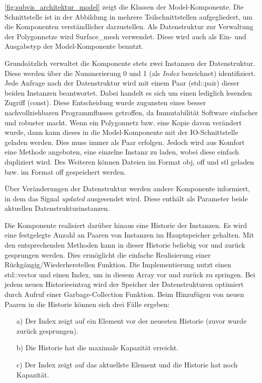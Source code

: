 \autoref{fig:subvis_architektur_model} zeigt die Klassen der Model-Komponente.
Die Schnittstelle ist in der Abbildung in mehrere Teilschnittstellen aufgegliedert, um die Komponenten verständlicher darzustellen.
Als Datenstruktur zur Verwaltung der Polygonnetze wird Surface\_mesh verwendet.
Diese wird auch als Ein- und Ausgabetyp der Model-Komponente benutzt.

Grundsätzlich verwaltet die Komponente stets zwei Instanzen der Datenstruktur.
Diese werden über die Nummerierung 0 und 1 (als \emph{Index} bezeichnet) identifiziert.
Jede Anfrage nach der Datenstruktur wird mit einem Paar (std::pair) dieser beiden Instanzen beantwortet. 
Dabei handelt es sich um einen lediglich lesenden Zugriff (const).
Diese Entscheidung wurde zugunsten eines besser nachvollziehbaren Programmflusses getroffen, da Immutabilität Software einfacher und robuster macht.
Wenn ein Polygonnetz bzw. eine Kopie davon verändert wurde, dann kann dieses in die Model-Komponente mit der IO-Schnittstelle geladen werden.
Dies muss immer als Paar erfolgen. 
Jedoch wird aus Komfort eine Methode angeboten, eine einzelne Instanz zu laden, wobei diese einfach dupliziert wird.
Des Weiteren können Dateien im Format obj, off und stl geladen bzw. im Format off gespeichert werden.

Über Veränderungen der Datenstruktur werden andere Komponente informiert, in dem das Signal \emph{updated} ausgesendet wird. 
Diese enthält als Parameter beide aktuellen Datenstrukturinstanzen.

Die Komponente realisiert darüber hinaus eine Historie der Instanzen.
Es wird eine festgelegte Anzahl an Paaren von Instanzen im Hauptspeicher gehalten.
Mit den entsprechenden Methoden kann in dieser Historie beliebig vor und zurück gesprungen werden.
Dies ermöglicht die einfache Realisierung einer Rückgängig/Wiederherstellen Funktion.
Die Implementierung nutzt einen std::vector und einen Index, um in diesem Array vor und zurück zu springen.
Bei jedem neuen Historieeintrag wird der Speicher der Datenstrukturen optimiert durch Aufruf einer Garbage-Collection Funktion.
Beim Hinzufügen von neuen Paaren in die Historie können sich drei Fälle ergeben:

\begin{itemize}
\item[a)] Der Index zeigt auf ein Element vor der neuesten Historie (zuvor wurde zurück gesprungen).
\item[b)] Die Historie hat die maximale Kapazität erreicht.
\item[c)] Der Index zeigt auf das aktuellste Element und die Historie hat noch Kapazität.
\end{itemize}

